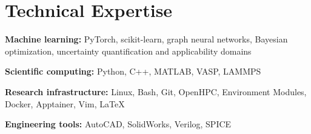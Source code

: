 \section{Technical Expertise}
\textbf{Machine learning:} PyTorch, scikit-learn, graph neural networks, Bayesian optimization,\newline
uncertainty quantification and applicability domains\par
\textbf{Scientific computing:} Python, C++, MATLAB, VASP, LAMMPS\par
\textbf{Research infrastructure:} Linux, Bash, Git, OpenHPC, Environment Modules, Docker, Apptainer, Vim, \LaTeX\par
\textbf{Engineering tools:} AutoCAD, SolidWorks, Verilog, SPICE
